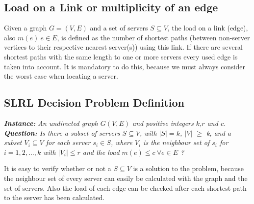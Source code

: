 \documentclass [12pt]{article}
\newtheorem{mydef}{Definition}
\begin{document}
\subsection{Load on a Link or multiplicity of an edge}
Given a graph $G=(V,E)$ and a set of servers $S \subseteq V$, the load on a link (edge), also $m(e) \ e \in E$, is defined as the number of 
shortest paths (between non-server vertices to their respective nearest server(s)) using this link. If there
are several shortest paths with the same length to one or more servers every
used edge is taken into account. It is mandatory to do this, because we must always consider
the worst case when locating a server. 
\subsection{SLRL Decision Problem Definition}

{\itshape \textbf{Instance:} An undirected graph $G(V,E)$ and  positive integers $k$,$r$ and $c$.\\
  \textbf{Question:} 
  Is there a subset of servers $S \subseteq V$, with $|S| = k$, $|V|$ $\geq$ k,
  and a subset $V_i \subseteq V$ for each server $s_i \in S$, where $V_i$ is the neighbour set of $s_i$ for $i=1,2,\dots,k$ with $|V_i| \leq r$ 
and the load $m(e) \leq c \ \forall e \in E$ ?}
\medskip

\noindent
It is easy to verify whether or not a $S \subseteq V$ is a solution to the problem, because the neighbour set
of every server can easily be calculated with the graph and the set of servers. Also the load of each edge
can be checked after each shortest path to the server has been calculated.
\end{document}
